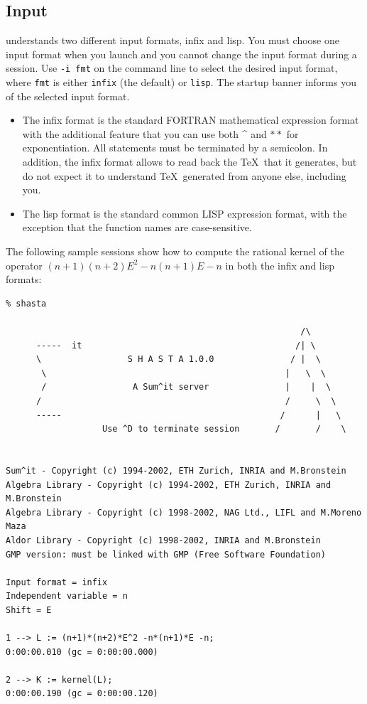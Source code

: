 \subsection{Input}
\shasta{} understands two different input formats, infix and lisp.
You must choose one input format when you launch \shasta{} and you
cannot change the input format during a session.
Use {\tt -i fmt} on the command line
to select the desired input format, where {\tt fmt}
is either {\tt infix} (the default) or {\tt lisp}. The startup banner
informs you of the selected input format.
\begin{itemize}
\item
The infix format is the standard FORTRAN mathematical expression format
with the additional feature that you can use both \^{} and $\ast\ast$ for
exponentiation. All statements must be terminated by a semicolon.
In addition, the infix format allows \shasta{} to read back
the \TeX~that it generates, but do not expect it to understand \TeX~generated
from anyone else, including you.
\item
The lisp format is the standard common LISP
expression format, with the exception that the \shasta{} function names
are case-sensitive.
\end{itemize}
The following sample sessions show how to compute the rational kernel of the
operator $(n+1)(n+2)E^2 -n(n+1)E - n$ in both the infix and lisp formats:
\begin{verbatim}
% shasta

                                                          /\    
      -----  it                                          /| \    
      \                 S H A S T A 1.0.0               / |  \    
       \                                               |   \  \   
       /                 A Sum^it server               |    |  \  
      /                                                /     \  \ 
      -----                                           /      |   \
                   Use ^D to terminate session       /       /    \


Sum^it - Copyright (c) 1994-2002, ETH Zurich, INRIA and M.Bronstein
Algebra Library - Copyright (c) 1994-2002, ETH Zurich, INRIA and M.Bronstein
Algebra Library - Copyright (c) 1998-2002, NAG Ltd., LIFL and M.Moreno Maza
Aldor Library - Copyright (c) 1998-2002, INRIA and M.Bronstein
GMP version: must be linked with GMP (Free Software Foundation)

Input format = infix
Independent variable = n
Shift = E

1 --> L := (n+1)*(n+2)*E^2 -n*(n+1)*E -n;
0:00:00.010 (gc = 0:00:00.000)

2 --> K := kernel(L);
0:00:00.190 (gc = 0:00:00.120)
\end{verbatim}
